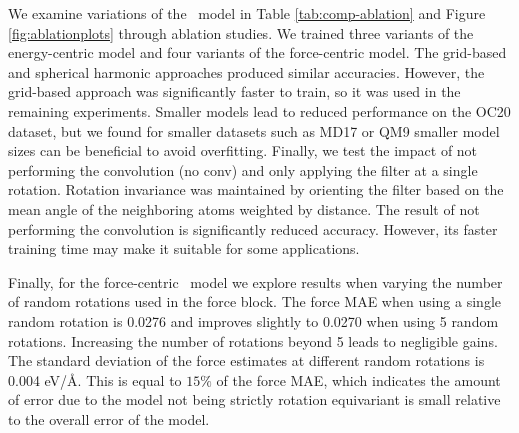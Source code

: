 We examine variations of the \model~model in Table \ref{tab:comp-ablation} and Figure \ref{fig:ablationplots} through ablation studies. We trained three variants of the energy-centric model and four variants of the force-centric model. The grid-based and spherical harmonic approaches produced similar accuracies. However, the grid-based approach was significantly faster to train, so it was used in the remaining experiments. Smaller models lead to reduced performance on the OC20 dataset, but we found for smaller datasets such as MD17 or QM9 smaller model sizes can be beneficial to avoid overfitting. Finally, we test the impact of not performing the convolution (no conv) and only applying the filter at a single rotation. Rotation invariance was maintained by orienting the filter based on the mean angle of the neighboring atoms weighted by distance. The result of not performing the convolution is significantly reduced accuracy. However, its faster training time may make it suitable for some applications. 

Finally, for the force-centric \model~model we explore results when varying the number of random rotations used in the force block. The force MAE when using a single random rotation is 0.0276 and improves slightly to 0.0270 when using 5 random rotations. Increasing the number of rotations beyond 5 leads to negligible gains. The standard deviation of the force estimates at different random rotations is 0.004 eV/\AA. This is equal to $15\%$ of the force MAE, which indicates the amount of error due to the model not being strictly rotation equivariant is small relative to the overall error of the model.

